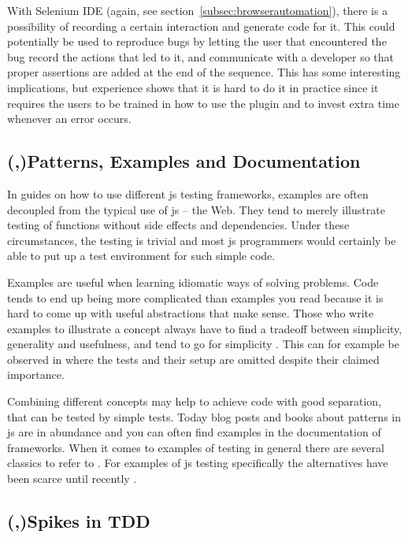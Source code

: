 \documentclass[11pt]{article}
\begin{document}
With Selenium IDE (again, see section~\ref{subsec:browserautomation}), there is a possibility of recording a certain interaction and generate code for it. This could potentially be used to reproduce bugs by letting the user that encountered the bug record the actions that led to it, and communicate with a developer so that proper assertions are added at the end of the sequence. This has some interesting implications, but experience shows that it is hard to do it in practice since it requires the users to be trained in how to use the plugin and to invest extra time whenever an error occurs. \cite[questions~42-43]{Edelstam}

\subsection{(,)Patterns, Examples and Documentation}
\label{subsec:patternsexamples}

In guides on how to use different \gls{js} testing frameworks, examples are often decoupled from the typical use of \gls{js} -- the Web. They tend to merely illustrate testing of functions without side effects and dependencies. Under these circumstances, the testing is trivial and most \gls{js} programmers would certainly be able to put up a test environment for such simple code.

Examples are useful when learning idiomatic ways of solving problems. Code tends to end up being more complicated than examples you read because it is hard to come up with useful abstractions that make sense. Those who write examples to illustrate a concept always have to find a tradeoff between simplicity, generality and usefulness, and tend to go for simplicity \cite[questions~56-57]{Edelstam}. This can for example be observed in \cite[p.~13-45]{Refactoring} where the tests and their setup are omitted despite their claimed importance.

Combining different concepts may help to achieve code with good separation, that can be tested by simple tests. Today blog posts and books about patterns in \gls{js} are in abundance and you can often find examples in the documentation of frameworks. When it comes to examples of testing in general there are several classics to refer to \cite{KentBeck}\cite{TestPatterns}. For examples of \gls{js} testing specifically the alternatives have been scarce until recently \cite{Tddjs}\cite{BDDJS}\cite{TestableJS}\cite{JasmineBook}.

\subsection{(,)Spikes in TDD}
\end{document}
